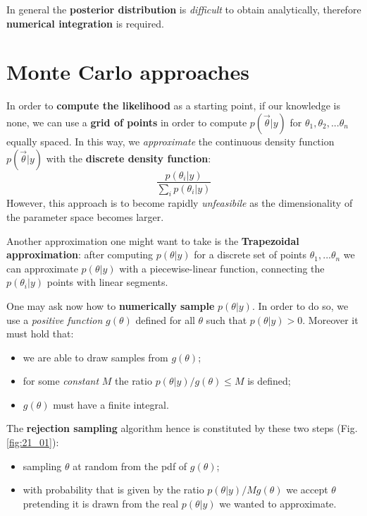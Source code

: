 \documentclass[../main/main.tex]{subfiles}
\begin{document}

In general the \textbf{posterior distribution} is \textit{difficult} to obtain analytically, therefore \textbf{numerical integration} is required.

\section{Monte Carlo approaches}

In order to \textbf{compute the likelihood} as a starting point, if our knowledge is none, we can use a \textbf{grid of points} in order to compute $p(\vec{\theta}|y)$ for $\theta_1,\theta_2,...\theta_n$ equally spaced. In this way, we \textit{approximate} the continuous density function $p(\vec{\theta}|y)$ with the \textbf{discrete density function}:
\begin{equation*}
   \frac{p(\theta_i |y)} {\sum_i p(\theta_i|y)}
\end{equation*}
However, this approach is to become rapidly \textit{unfeasibile} as the dimensionality of the parameter space becomes larger.

Another approximation one might want to take is the \textbf{Trapezoidal approximation}: after computing $p(\theta|y)$ for a discrete set of points $\theta_1,...\theta_n$ we can approximate $p(\theta|y)$ with a piecewise-linear function, connecting the $p(\theta_i|y)$ points with linear segments.


One may ask now how to \textbf{numerically sample} $p(\theta|y)$. In order to do so, we use a \textit{positive function} $g(\theta)$ defined for all $\theta$ such that $p(\theta|y) > 0$. Moreover it must hold that:
\begin{itemize}
\item we are able to draw samples from $g(\theta)$;
\item for some \textit{constant} $M$ the ratio $p(\theta|y)/g(\theta) \leqslant M$ is defined;
\item $g(\theta)$ must have a finite integral.
\end{itemize}
The \textbf{rejection sampling} algorithm hence is constituted by these two steps (Fig. \ref{fig:21_01}):
\begin{itemize}
    \item  sampling $\theta$ at random from the pdf of $g(\theta)$;
    \item with probability that is given by the ratio $p(\theta|y)/Mg(\theta)$ we accept $\theta$ pretending it is drawn from the real $p(\theta|y)$ we wanted to approximate.
\end{itemize}
\end{document}
